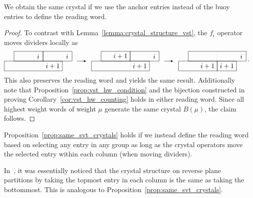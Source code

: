 \documentclass[ALCO,ThmDefs,Unicode,epreuves]{cedram}
\begin{document}
\begin{prop}
\label{prop:same_svt_crystals}
We obtain the same crystal if we use the anchor entries instead of the buoy entries to define the reading word.
\end{prop}

\begin{proof}
To contrast with Lemma~\ref{lemma:crystal_structure_vst}, the $f_i$ operator moves dividers locally as
\[
\begin{tikzpicture}[scale=0.5,>=latex,baseline=0]
\draw[-] (0,0) rectangle (3,1);
\draw[-] (3,0) rectangle (6,1);
\draw[-] (-1,0) rectangle (5,-1);
\draw[dotted] (3,0) -- (3,-1);
\draw (4,0) node[anchor=north] {$i+1$};
\draw (2.5,0) node[anchor=south] {$i$};
\draw (5.5,0) node[anchor=south] {$i$};
\draw[->] (6.5,0) -- (7.5,0);
\begin{scope}[xshift=9cm]
\draw[-] (0,0) rectangle (3,1);
\draw[-] (3,0) rectangle (6,1);
\draw[-] (-1,0) rectangle (5,-1);
\draw[dotted] (3,0) -- (3,-1);
\draw (4,0) node[anchor=north] {$i+1$};
\draw (2,0) node[anchor=south] {$i+1$};
\draw (5.5,0) node[anchor=south] {$i$};
\end{scope}
\draw[->] (15.5,0) -- (16.5,0);
\begin{scope}[xshift=18cm]
\draw[-] (0,0) rectangle (6,1);
\draw[-] (-1,0) rectangle (3,-1);
\draw[-] (3,0) rectangle (5,-1);
\draw[dotted] (3,0) -- (3,1);
\draw (2,0) node[anchor=north] {$i+1$};
\draw (5.5,0) node[anchor=south] {$i$};
\draw (4,0) node[anchor=north] {$i+1$};
\end{scope}
\end{tikzpicture}\,.
\]
This also preserves the reading word and yields the same result.
Additionally note that Proposition~\ref{prop:vst_hw_condition} and the bijection constructed in proving Corollary~\ref{cor:vst_hw_counting} holds in either reading word.
Since all highest weight words of weight $\mu$ generate the same crystal $B(\mu)$, the claim follows.
\end{proof}

Proposition~\ref{prop:same_svt_crystals} holds if we instead define the reading word based on selecting any entry in any group as long as the crystal operators move the selected entry within each column (when moving dividers).

\begin{rema}
In~\cite[Remark~9]{Galashin17}, it was essentially noticed that the crystal structure on reverse plane partitions by taking the topmost entry in each column is the same as taking the bottommost. This is analogous to Proposition~\ref{prop:same_svt_crystals}.
\end{rema}
\end{document}
